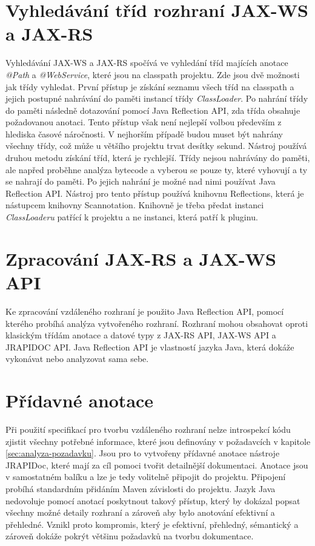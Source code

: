 \documentclass[11pt,twoside,a4paper]{book}
\begin{document}
\section{Vyhledávání tříd rozhraní JAX-WS a JAX-RS}

Vyhledávání JAX-WS a JAX-RS spočívá ve vyhledání tříd majících anotace {\em
@Path} a {\em @WebService}, které jsou na classpath projektu. Zde jsou dvě
možnosti jak třídy vyhledat.
První přístup je získání seznamu všech tříd na classpath a jejich postupné
nahrávání do paměti instancí třídy {\em ClassLoader}. Po nahrání třídy do paměti
následně dotazování pomocí Java Reflection API, zda třída obsahuje požadovanou
anotaci. Tento přístup však není nejlepší volbou především z hlediska časové
náročnosti. V nejhorším případě budou muset být nahrány všechny třídy, což může
u většího projektu trvat desítky sekund. Nástroj používá druhou metodu získání
tříd, která je rychlejší. Třídy nejsou nahrávány do paměti, ale napřed proběhne
analýza bytecode a vyberou se pouze ty, které vyhovují a ty se nahrají do
paměti.
Po jejich nahrání je možné nad nimi používat Java Reflection API. Nástroj pro
tento přístup používá knihovnu Reflections, která je nástupcem knihovny
Scannotation. Knihovně je třeba předat instanci {\em ClassLoaderu} patřící k
projektu a ne instanci, která patří k pluginu.

\section{Zpracování JAX-RS a JAX-WS API}

Ke zpracování vzdáleného rozhraní je použito Java Reflection API, pomocí kterého probíhá
analýza vytvořeného rozhraní. Rozhraní mohou obsahovat oproti klasickým třídám anotace a
datové typy z JAX-RS API, JAX-WS API a JRAPIDOC API. Java Reflection API je
vlastností jazyka Java, která dokáže vykonávat nebo analyzovat sama sebe.

\section{Přídavné anotace}

Při použití specifikací pro tvorbu vzdáleného rozhraní nelze introspekcí kódu
zjistit všechny potřebné informace, které jsou definovány v požadavcích v
kapitole \ref{sec:analyza-pozadavku}.
Jsou pro to vytvořeny přídavné anotace nástroje JRAPIDoc, které mají za cíl
pomoci tvořit detailnější dokumentaci. Anotace jsou v samostatném balíku a lze
je tedy volitelně připojit do projektu. Připojení probíhá standardním přidáním
Maven závislosti do projektu. Jazyk Java nedovoluje pomocí anotací poskytnout
takový přístup, který by dokázal popsat všechny možné detaily rozhraní a zároveň
aby bylo anotování efektivní a přehledné. Vznikl proto kompromis, který je
efektivní, přehledný, sémantický a zároveň dokáže pokrýt většinu požadavků na
tvorbu dokumentace.
\end{document}
